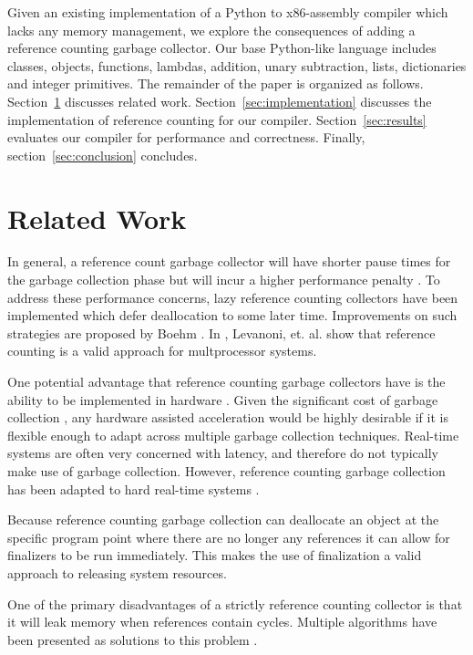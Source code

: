 \documentclass{sigplanconf}
\begin{document}
Given an existing implementation of a Python to x86-assembly compiler which lacks any memory management, we explore the consequences of adding a reference counting garbage collector.  Our base Python-like language includes classes, objects, functions, lambdas, addition, unary subtraction, lists, dictionaries and integer primitives.  The remainder of the paper is organized as follows.  Section~\ref{sec:related} discusses related work.  Section~\ref{sec:implementation} discusses the implementation of reference counting for our compiler.  Section~\ref{sec:results} evaluates our compiler for performance and correctness.  Finally, section~\ref{sec:conclusion} concludes.


\section{Related Work}
\label{sec:related}
In general, a reference count garbage collector will have shorter pause times for the garbage collection phase but will incur a higher performance penalty \cite{joisha}\cite{blackburn}.  To address these performance concerns, lazy reference counting collectors have been implemented which defer deallocation to some later time.  Improvements on such strategies are proposed by Boehm \cite{boehm}. In \cite{levanoni}, Levanoni, et. al. show that reference counting is a valid approach for multprocessor systems. 

One potential advantage that reference counting garbage collectors have is the ability to be implemented in hardware \cite{joao}.  Given the significant cost of garbage collection \cite{hertz}, any hardware assisted acceleration would be highly desirable if it is flexible enough to adapt across multiple garbage collection techniques.  Real-time systems are often very concerned with latency, and therefore do not typically make use of garbage collection.  However, reference counting garbage collection has been adapted to hard real-time systems \cite{ritzaou}. 

Because reference counting garbage collection can deallocate an object at the specific program point where there are no longer any references it can allow for finalizers to be run immediately.  This makes the use of finalization a valid approach to releasing system resources.   

One of the primary disadvantages of a strictly reference counting collector is that it will leak memory when references contain cycles.  Multiple algorithms have been presented as solutions to this problem \cite{lin}\cite{trancon}.
\end{document}
